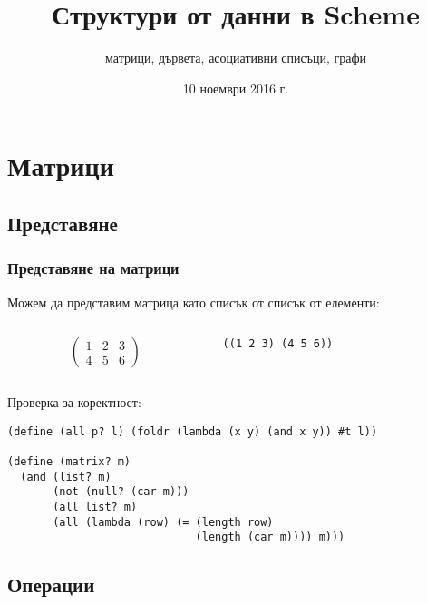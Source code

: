 \documentclass{beamer}
\title{Структури от данни в Scheme}
\subtitle{матрици, дървета, асоциативни списъци, графи}
\date{10 ноември 2016 г.}
\begin{document}
\begin{frame}
  \titlepage
\end{frame}

\section{Матрици}

\subsection{Представяне}

\begin{frame}[fragile]
  \frametitle{Представяне на матрици}
  Можем да представим матрица като списък от списък от елементи:

  \begin{columns}[t,onlytextwidth]
    \begin{column}{0.5\textwidth}
      \begin{equation*}
        \left(
          \begin{array}{ccc}
            1 & 2 & 3\\
            4 & 5 & 6
          \end{array}
        \right)
      \end{equation*}
    \end{column}
    \begin{column}{0.5\textwidth}

      \tt{((1 2 3) (4 5 6))}
    \end{column}
  \end{columns}
  \vspace{1em}
  \pause
  Проверка за коректност:
  \pause
\begin{lstlisting}
(define (all p? l) (foldr (lambda (x y) (and x y)) #t l))

(define (matrix? m)
  (and (list? m)
       (not (null? (car m)))
       (all list? m)
       (all (lambda (row) (= (length row)
                             (length (car m)))) m)))
\end{lstlisting}
\end{frame}

\subsection{Операции}
\end{document}
